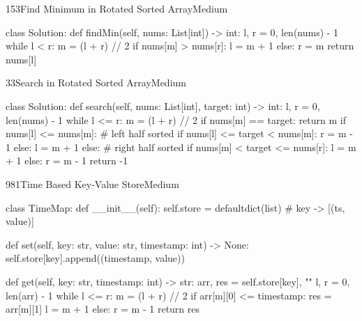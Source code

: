 \begin{problem}{153}{Find Minimum in Rotated Sorted Array}{Medium}
\begin{code}
class Solution:
    def findMin(self, nums: List[int]) -> int:
        l, r = 0, len(nums) - 1
        while l < r:
            m = (l + r) // 2
            if nums[m] > nums[r]:
                l = m + 1
            else:
                r = m
        return nums[l]
\end{code}
\end{problem}

\begin{problem}{33}{Search in Rotated Sorted Array}{Medium}
\begin{code}
class Solution:
    def search(self, nums: List[int], target: int) -> int:
        l, r = 0, len(nums) - 1
        while l <= r:
            m = (l + r) // 2
            if nums[m] == target:
                return m
            if nums[l] <= nums[m]:            # left half sorted
                if nums[l] <= target < nums[m]:
                    r = m - 1
                else:
                    l = m + 1
            else:                              # right half sorted
                if nums[m] < target <= nums[r]:
                    l = m + 1
                else:
                    r = m - 1
        return -1
\end{code}
\end{problem}

\begin{problem}{981}{Time Based Key-Value Store}{Medium}
\begin{code}
class TimeMap:
    def __init__(self):
        self.store = defaultdict(list)  # key -> [(ts, value)]

    def set(self, key: str, value: str, timestamp: int) -> None:
        self.store[key].append((timestamp, value))

    def get(self, key: str, timestamp: int) -> str:
        arr, res = self.store[key], ""
        l, r = 0, len(arr) - 1
        while l <= r:
            m = (l + r) // 2
            if arr[m][0] <= timestamp:
                res = arr[m][1]
                l = m + 1
            else:
                r = m - 1
        return res
\end{code}
\end{problem}

